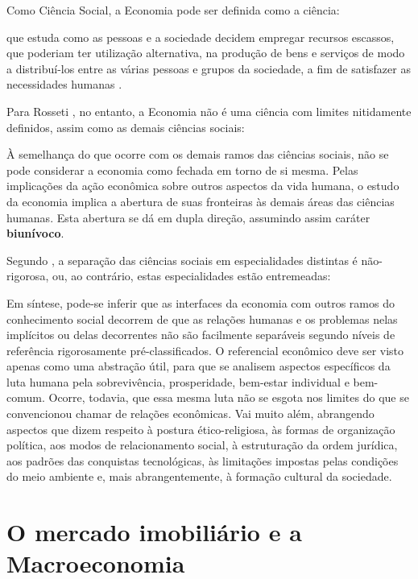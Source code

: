 \documentclass[
	12pt,				%
	oneside,			%
	a4paper,			%
	chapter=TITLE,		%
	section=TITLE,		%
	english,			%
	brazil				%
	]{abntex2}
\begin{document}
Como Ciência Social, a Economia pode ser definida como a ciência:
\begin{citacao}
que estuda como as pessoas e a sociedade decidem empregar recursos escassos, que
poderiam ter utilização alternativa, na produção de bens e serviços de modo a
distribuí-los  entre as várias pessoas e grupos da sociedade, a fim de
satisfazer as necessidades humanas
\cite[p.~5]{passosnogami}.
\end{citacao}
Para Rosseti \autocite*[31]{rossetti}, no entanto, a Economia não é uma ciência com
limites nitidamente definidos, assim como as demais ciências sociais:
\begin{citacao}
À semelhança do que ocorre com os demais ramos das ciências sociais, não se pode
considerar a economia como fechada em torno de si mesma. Pelas implicações da
ação econômica sobre outros aspectos da vida humana, o estudo da economia
implica a abertura de suas fronteiras às demais áreas das ciências humanas. Esta
abertura se dá em dupla direção, assumindo assim caráter \textbf{biunívoco}.
\end{citacao}
Segundo \autocite*[32]{rossetti}, a separação das ciências sociais em
especialidades distintas é não-rigorosa, ou, ao contrário, estas especialidades
estão entremeadas:
\begin{citacao}
Em síntese, pode-se inferir que as interfaces da economia com outros ramos do
conhecimento social decorrem de que as relações humanas e os problemas nelas
implícitos ou delas decorrentes não são facilmente separáveis segundo níveis de
referência rigorosamente pré-classificados. O referencial econômico deve ser
visto apenas como uma abstração útil, para que se analisem aspectos específicos
da luta humana pela sobrevivência, prosperidade, bem-estar individual e
bem-comum. Ocorre, todavia, que essa mesma luta não se esgota nos limites do que
se convencionou chamar de relações econômicas. Vai muito além, abrangendo
aspectos que dizem respeito à postura ético-religiosa, às formas de organização
política, aos modos de relacionamento social, à estruturação da ordem jurídica,
aos padrões das conquistas tecnológicas, às limitações impostas pelas condições
do meio ambiente e, mais abrangentemente, à formação cultural da sociedade.
\end{citacao}
\hypertarget{macro}{%
\section{O mercado imobiliário e a Macroeconomia}\label{macro}}
\end{document}
